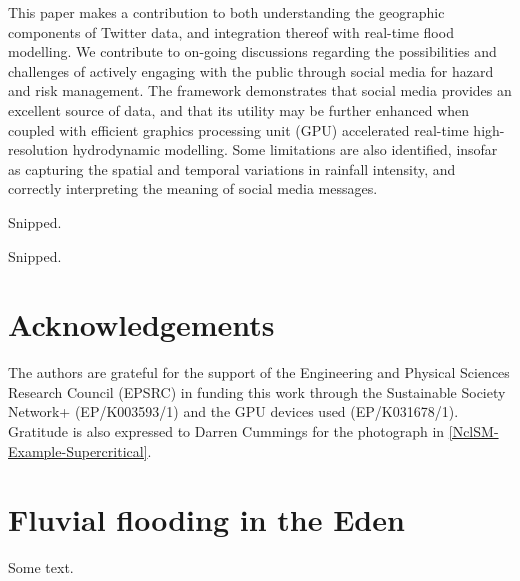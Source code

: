 This paper makes a contribution to both understanding the geographic components of Twitter data, and integration thereof with real-time flood modelling. We contribute to on-going discussions regarding the possibilities and challenges of actively engaging with the public through social media for hazard and risk management.  The framework demonstrates that social media provides an excellent source of data, and that its utility may be further enhanced when coupled with efficient graphics processing unit (GPU) accelerated real-time high-resolution hydrodynamic modelling. Some limitations are also identified, insofar as capturing the spatial and temporal variations in rainfall intensity, and correctly interpreting the meaning of social media messages. 

Snipped.

Snipped.

\section*{Acknowledgements}
The authors are grateful for the support of the Engineering and Physical Sciences Research Council (EPSRC) in funding this work through the Sustainable Society Network+ (EP/K003593/1) and the GPU devices used (EP/K031678/1). Gratitude is also expressed to Darren Cummings for the photograph in \ref{NclSM-Example-Supercritical}.

\section{Fluvial flooding in the Eden}

Some text.
